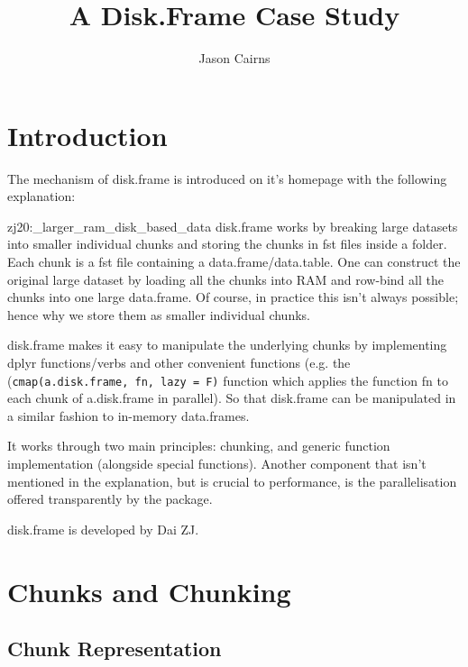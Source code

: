 \documentclass[10pt,a4paper]{article}
\begin{document}
\title{A Disk.Frame Case Study}
\author{Jason Cairns}
  
\maketitle{}

\section{Introduction}
\label{sec:introduction}

The mechanism of disk.frame is introduced on it's homepage with the
following explanation:

\begin{displaycquote}{zj20:_larger_ram_disk_based_data}
  {disk.frame} works by breaking large datasets into smaller
  individual chunks and storing the chunks in fst files inside a
  folder. Each chunk is a fst file containing a data.frame/data.table.
  One can construct the original large dataset by loading all the
  chunks into RAM and row-bind all the chunks into one large
  data.frame. Of course, in practice this isn’t always possible; hence
  why we store them as smaller individual chunks.

  {disk.frame} makes it easy to manipulate the underlying chunks by
  implementing dplyr functions/verbs and other convenient functions
  (e.g. the (\texttt{cmap(a.disk.frame, fn, lazy = F)} function which
  applies the function fn to each chunk of a.disk.frame in parallel).
  So that {disk.frame} can be manipulated in a similar fashion to
  in-memory data.frames.
\end{displaycquote}

It works through two main principles: chunking, and generic function
implementation (alongside special functions). Another component that
isn't mentioned in the explanation, but is crucial to performance, is
the parallelisation offered transparently by the package.

disk.frame is developed by Dai ZJ.

\section{Chunks and Chunking}
\label{sec:chunking}

\subsection{Chunk Representation}
\label{sec:chunk-representation}
\end{document}
